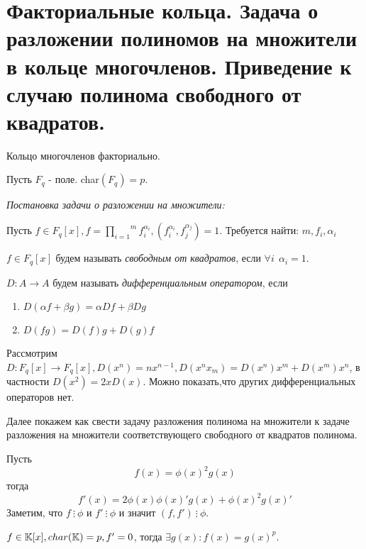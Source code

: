 \section{Факториальные кольца. Задача о разложении полиномов на множители в кольце многочленов. Приведение к случаю полинома свободного от квадратов.}

\begin{thm}
  Кольцо многочленов факториально. \newline
\end{thm}

Пусть $ F_{q} $ - поле. char$(F_q) = p $. \newline

\emph{Постановка задачи о разложении на множители:} \newline

Пусть $ f \in F_{q}[x],  f = \overset{m}{\underset{i = 1}{\prod}} f_i^{\alpha_i},
 (f_i^{\alpha_i}, f_j^{\alpha_j}) = 1 $. Требуется найти: $ m, f_i, \alpha_i $

\begin{defn}
  $ f \in F_{q}[x] $ будем называть \emph{свободным от квадратов}, если $ \forall i ~~ \alpha_i = 1 $.
\end{defn}

\begin{defn}
  $ D : A \rightarrow A $ будем называть \emph{дифференциальным оператором}, если 
  \begin{enumerate}
    \item $ D({\alpha}f + {\beta}g) = {\alpha}Df + {\beta}Dg $
    \item $ D(fg) = D(f)g + D(g)f $
  \end{enumerate}
\end{defn}

Рассмотрим $ D : F_q[x] \rightarrow F_q[x], D(x^n) = nx^{n-1}, D(x^{n}x_{m}) = D(x^n)x^m + D(x^m)x^n $, 
в частности $ D(x^2) = 2xD(x) $. Можно показать,что других дифференциальных операторов нет.

Далее покажем как свести задачу разложения полинома на множители к задаче разложения на множители соответствующего
свободного от квадратов полинома.

Пусть \[ f(x) = \phi(x)^2g(x) \] тогда \[ f'(x) = 2\phi(x)\phi(x)'g(x) + \phi(x)^2g(x)' \]
Заметим, что $ f ~ \vdots ~ \phi $ и $ f' ~ \vdots ~ \phi $ и значит $ (f, f') ~ \vdots ~ \phi $.

\begin{lem}
  $ f \in \mathbb{K}[x], char(\mathbb{K}) = p, f' = 0 $, тогда $ \exists g(x) : f(x) = g(x)^p $. 
\end{lem}

